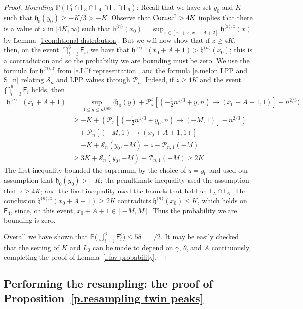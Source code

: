 \documentclass[oneside,final,11pt]{amsart}
\theoremstyle{definition}
\newcounter{assum}
\newcommand{\Corner}{\mathrm{Corner}}
\renewcommand{\L}{\CP}
\newcommand{\fh}{\mathfrak{h}}
\newcommand{\h}{\fh^{{\scriptscriptstyle(}n{\scriptscriptstyle)}}}
\newcommand{\hz}[1]{\fh^{{\scriptscriptstyle(}n{\scriptscriptstyle)},#1}}
\newcommand{\CS}{\mathcal{S}}
\renewcommand{\S}{\CS}
\newcommand{\1}[1]{\mathbf{1}_{#1}}
\newcommand{\hlim}{\mathfrak{h}}
\newcommand{\msf}{\mathsf}
\newcommand{\CP}{\mathcal{P}}
\renewcommand{\P}{\mathbb P}
\numberwithin{equation}{section}
\begin{document}
\begin{proof}
\medskip


\noindent\emph{Bounding $\P(\msf F_1^c\cap \msf F_3\cap \msf F_4\cap \msf F_5\cap \msf F_6)$}: Recall that we have set $y_0$ and $K$ such that $\hlim_0(y_0) \geq -K/3 > -K$. Observe that $\smash{\Corner^{\uparrow}} > 4K$ implies that there is a value of $z$ in $[4K, \infty)$ such that $\h(x_0) = \sup_{x\in [x_0+A,x_0+A+2]} \hz{z}(x)$ by Lemma~\ref{l.conditional distribution}. But we will now show that if $z\geq 4K$, then, on the event $\bigcap_{i=3}^6 \msf F_i$, we have that $\hz{z}(x_0+A+1) > \h(x_0)$; this is a contradiction and so the probability we are bounding must be zero.
We use the formula for $\hz{z}$ from \eqref{e.L^f representation}, and the formula \eqref{e.melon LPP and S_n} relating $\S_n$ and LPP values through $\L_n$. Indeed, if $z\geq 4K$ and the event $\bigcap_{i=3}^6 \msf F_i$ holds, then
%
\begin{align*}
\hz{z}(x_0+A+1) &= \sup_{0\leq y \leq n^{1/60}} \Big(\hlim_0(y) + \L_n^{z}[(-\tfrac12n^{1/3}+ y, n) \to (x_0+A+1, 1)]-n^{2/3}\Big)\\
%
&\geq -K + \left(\L_n^z[(-\tfrac12n^{1/3}+ y_0, n) \to (-M, 1)] - n^{2/3}\right)\\
%
&\quad + \L_n^z[(-M, 1) \to (x_0+A+1,1)]\\
%
&= -K + \S_n(y_0, -M) + z - \L_{n,1}(-M)\\
%
&\geq 3K + \S_n(y_0, -M)  - \L_{n,1}(-M) \geq 2K.
\end{align*}
%
The first inequality bounded the supremum by the choice of $y=y_0$ and used our assumption that $\hlim_0(y_0) > -K$; the penultimate inequality used the assumption that $z\geq4K$;  and the final inequality used the bounds that hold on $\msf F_5\cap\msf F_6$.
%
The conclusion $\hz{z}(x_0+A+1)  \geq 2K$ contradicts $\h(x_0) \leq K$, which holds on $\msf F_4$, since, on this event, $x_0+A+1 \in [-M,M]$. Thus the probability we are bounding is zero.

Overall we have shown that $\P\big(\bigcup_{i=1}^6 \msf F_i^c\big) \leq 5\delta = 1/2$. It may be easily checked that the setting of $K$ and $L_0$ can be made to depend on $\gamma$, $\theta$, and $A$ continuously, completing the proof of Lemma~\ref{l.fav probability}.
\end{proof}

\subsection{Performing the resampling: the proof of Proposition~\ref{p.resampling twin peaks}}
\end{document}
